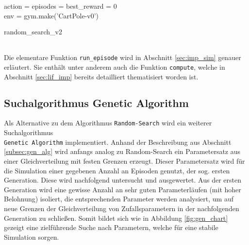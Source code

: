 		\begin{algorithm}
			
			
			action = episodes = best\_reward = 0\\
			env = gym.make('CartPole-v0')\\
			\caption{random\_search\_v2}
		\end{algorithm}\\
		Die elementare Funktion \texttt{run\_episode} wird in Abschnitt \ref{sec:imp_sim} genauer erläutert. Sie enthält unter anderem auch die Funktion \texttt{compute}, welche in Abschnitt \ref{sec:lif_imp} bereits detailliert thematisiert worden ist.
	\subsection{Suchalgorithmus Genetic Algorithm}
		\enlargethispage{2\baselineskip}
		Als Alternative zu dem Algorithmus \texttt{Random-Search} wird ein weiterer Suchalgorithmus\\ \texttt{Genetic Algorithm} implementiert. Anhand der Beschreibung aus Abschnitt \ref{subsec:gen_alg} wird anfangs analog zu Random-Search ein Parametersatz aus einer Gleichverteilung mit festen Grenzen erzeugt. Dieser Parametersatz wird für die Simulation einer gegebenen Anzahl an Episoden genutzt, der sog. ersten Generation. Diese wird nachfolgend untersucht und ausgewertet. Aus der ersten Generation wird eine gewisse Anzahl an sehr guten Parameterläufen (mit hoher Belohnung) isoliert, die entsprechenden Parameter werden analysiert, um auf neue Grenzen der Gleichverteilung von Zufallsparametern in der nachfolgenden Generation zu schließen. Somit bildet sich wie in Abbildung \ref{fig:gen_chart} gezeigt eine zielführende Suche nach Parametern, welche für eine stabile Simulation sorgen.
		
